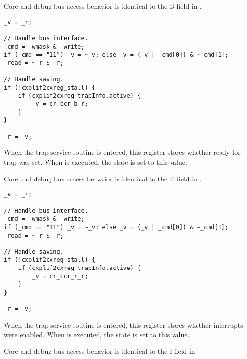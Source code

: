 Core and debug bus access behavior is identical to the B field in .

\declaration{}
\implementation{}
\begin{lstlisting}
_v = _r;

// Handle bus interface.
_cmd = _wmask & _write;
if (_cmd == "11") _v = ~_v; else _v = (_v | _cmd[0]) & ~_cmd[1];
_read = ~_r $ _r;

// Handle saving.
if (!cxplif2cxreg_stall) {
    if (cxplif2cxreg_trapInfo.active) {
        _v = cr_ccr_b_r;
    }
}

_r = _v;
\end{lstlisting}

When the trap service routine is entered, this register stores whether 
ready-for-trap was set. When  is executed, the state is set to this
value.

Core and debug bus access behavior is identical to the R field in .

\declaration{}
\implementation{}
\begin{lstlisting}
_v = _r;

// Handle bus interface.
_cmd = _wmask & _write;
if (_cmd == "11") _v = ~_v; else _v = (_v | _cmd[0]) & ~_cmd[1];
_read = ~_r $ _r;

// Handle saving.
if (!cxplif2cxreg_stall) {
    if (cxplif2cxreg_trapInfo.active) {
        _v = cr_ccr_r_r;
    }
}

_r = _v;
\end{lstlisting}

When the trap service routine is entered, this register stores whether 
interrupts were enabled. When  is executed, the state is set to this
value.

Core and debug bus access behavior is identical to the I field in .

